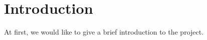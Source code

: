 \section{Introduction}
\label{sec:introduction}
At first, we would like to give a brief introduction to the project.